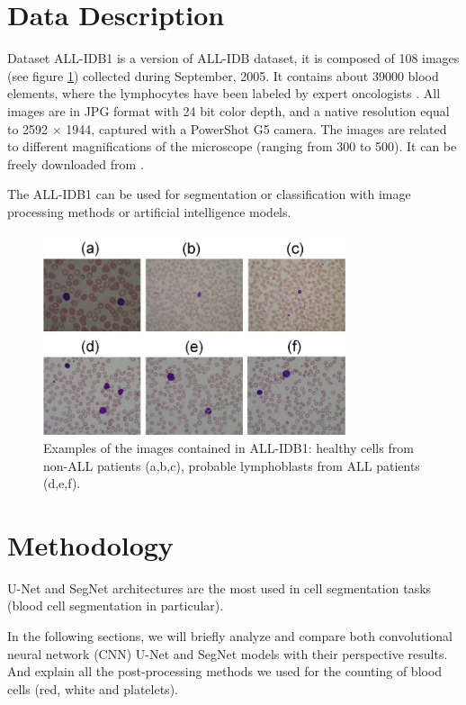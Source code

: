 \documentclass[conference]{IEEEtran}
\begin{document}
\section{Data Description}
Dataset ALL-IDB1 is a version of ALL-IDB dataset, it is composed of 108 images (see figure \ref{img1}) collected during September, 2005. It contains about 39000 blood elements, where the lymphocytes have been labeled by expert oncologists \cite{labati2011all}. All images are in JPG format with 24 bit color depth, and a native resolution equal to 2592 × 1944, captured with a PowerShot G5 camera. The images are related to different magnifications of the microscope (ranging from 300 to 500). It can be freely downloaded from \cite{ALL_IDB_L}.

The ALL-IDB1 can be used for segmentation or classification with image processing methods or artificial intelligence models.
\begin{figure}[h]
\centering
\includegraphics[width=3.5in]{images/ALLIDB1.jpg}
\caption{Examples of the images contained in ALL-IDB1: healthy cells from non-ALL patients (a,b,c), probable lymphoblasts from ALL patients (d,e,f). }
\label{img1}
\end{figure}


\section{Methodology}
U-Net and SegNet architectures are the most used in cell segmentation tasks (blood cell segmentation in particular).

In the following sections, we will briefly analyze and compare both convolutional neural network (CNN) U-Net and SegNet models with their perspective results.
And explain all the post-processing methods we used for the counting of blood cells (red, white and platelets).
\end{document}

